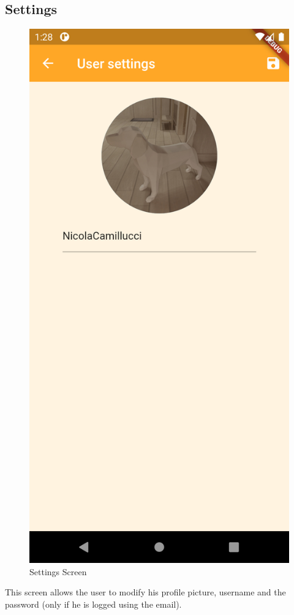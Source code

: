 \subsection{Settings}
\begin{figure}[H]
	\centering
	\includegraphics[width = .225\linewidth]{img/Settings.png}
	\caption{Settings Screen}
\end{figure}
This screen allows the user to modify his profile picture, username and the password (only if he is logged using the email).
